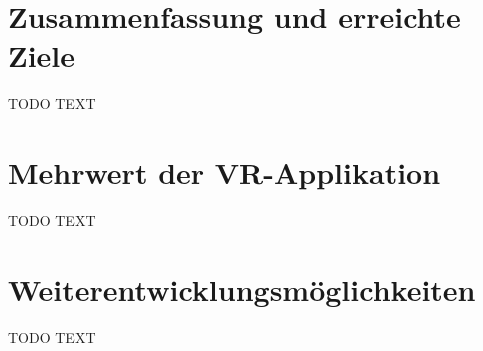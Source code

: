 
\section{Zusammenfassung und erreichte Ziele}
TODO TEXT

\section{Mehrwert der VR-Applikation}
TODO TEXT

\section{Weiterentwicklungsmöglichkeiten}
TODO TEXT